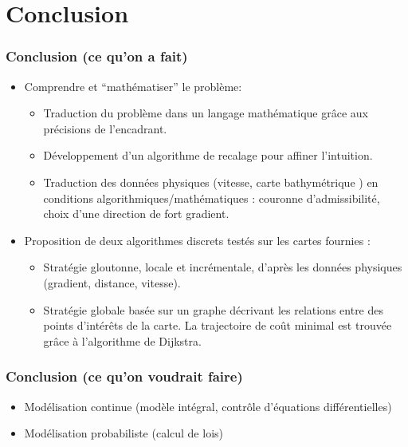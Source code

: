 \documentclass[11pt]{beamer}
\begin{document}
\section{Conclusion}
\begin{frame}
\frametitle{Conclusion (ce qu'on a fait)}
\begin{itemize}

\item Comprendre et ``mathématiser'' le problème:
\begin{itemize}
\item Traduction du problème dans un langage mathématique grâce aux
  précisions de l'encadrant.
\item Développement d'un algorithme de recalage pour affiner l'intuition.
\item Traduction des données physiques (vitesse, carte bathymétrique )
  en conditions algorithmiques/mathématiques : couronne d'admissibilité,
  choix d'une direction de fort gradient.
\end{itemize}

\item Proposition de deux algorithmes discrets testés sur les
  cartes fournies :
\begin{itemize}
\item Stratégie gloutonne, locale et incrémentale, d'après les données
  physiques (gradient, distance, vitesse).

\item Stratégie globale basée sur un graphe décrivant
  les relations entre des points d'intérêts de la carte. La
  trajectoire de coût minimal est trouvée grâce à l'algorithme de Dijkstra.
\end{itemize}
\end{itemize}
\end{frame}

\begin{frame}
\frametitle{Conclusion (ce qu'on voudrait faire)}
\begin{itemize}
  \item Modélisation continue (modèle intégral, contrôle d'équations
    différentielles)
  \item Modélisation probabiliste (calcul de lois)
\end{itemize}
\end{frame}
\end{document}
